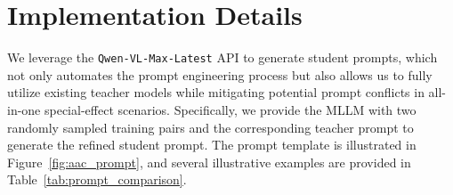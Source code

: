 \documentclass{llmxive}
\begin{document}
\section{Implementation Details}
We leverage the \texttt{Qwen-VL-Max-Latest} API to generate student prompts, which not only automates the prompt engineering process but also allows us to fully utilize existing teacher models while mitigating potential prompt conflicts in all-in-one special-effect scenarios. Specifically, we provide the MLLM with two randomly sampled training pairs and the corresponding teacher prompt to generate the refined student prompt. The prompt template is illustrated in Figure~\ref{fig:aac_prompt}, and several illustrative examples are provided in Table~\ref{tab:prompt_comparison}.
\end{document}
